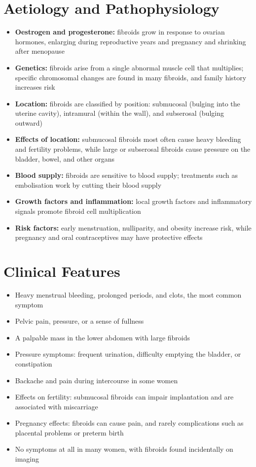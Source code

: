 \section*{Aetiology and Pathophysiology}
\begin{itemize}
    \item \textbf{Oestrogen and progesterone:} fibroids grow in response to ovarian hormones, enlarging during reproductive years and pregnancy and shrinking after menopause
    \item \textbf{Genetics:} fibroids arise from a single abnormal muscle cell that multiplies; specific chromosomal changes are found in many fibroids, and family history increases risk
    \item \textbf{Location:} fibroids are classified by position: submucosal (bulging into the uterine cavity), intramural (within the wall), and subserosal (bulging outward)
    \item \textbf{Effects of location:} submucosal fibroids most often cause heavy bleeding and fertility problems, while large or subserosal fibroids cause pressure on the bladder, bowel, and other organs
    \item \textbf{Blood supply:} fibroids are sensitive to blood supply; treatments such as embolisation work by cutting their blood supply
    \item \textbf{Growth factors and inflammation:} local growth factors and inflammatory signals promote fibroid cell multiplication
    \item \textbf{Risk factors:} early menstruation, nulliparity, and obesity increase risk, while pregnancy and oral contraceptives may have protective effects
\end{itemize}

\section*{Clinical Features}
\begin{itemize}
    \item Heavy menstrual bleeding, prolonged periods, and clots, the most common symptom
    \item Pelvic pain, pressure, or a sense of fullness
    \item A palpable mass in the lower abdomen with large fibroids
    \item Pressure symptoms: frequent urination, difficulty emptying the bladder, or constipation
    \item Backache and pain during intercourse in some women
    \item Effects on fertility: submucosal fibroids can impair implantation and are associated with miscarriage
    \item Pregnancy effects: fibroids can cause pain, and rarely complications such as placental problems or preterm birth
    \item No symptoms at all in many women, with fibroids found incidentally on imaging
\end{itemize}

